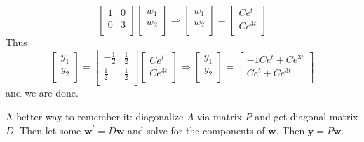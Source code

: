 \begin{solution}
\[\begin{bmatrix}
            1 &0   \\
             0&3   \\
        \end{bmatrix} \begin{bmatrix}
             w_1 \\
              w_2\\
        \end{bmatrix} \Longrightarrow \begin{bmatrix}
             w_1 \\
              w_2\\
        \end{bmatrix} = \begin{bmatrix}
             Ce^t \\
              Ce^{3t} \\
        \end{bmatrix}
    \]
    Thus
    \[
        \begin{bmatrix}
             y_1 \\
             y_2 \\
        \end{bmatrix} = \begin{bmatrix}
            -\frac{1}{2} &\frac{1}{2}   \\
             \frac{1}{2}&\frac{1}{2}   \\
        \end{bmatrix} \begin{bmatrix}
             Ce^t \\
              Ce^{3t} \\
        \end{bmatrix} \Longrightarrow \begin{bmatrix}
             y_1 \\
              y_2\\
        \end{bmatrix} = \begin{bmatrix}
             -1Ce^t + Ce^{3t}  \\
              Ce^t + Ce^{3t} \\
        \end{bmatrix}
    \]
    and we are done.
\end{solution}
\begin{remark}
    A better way to remember it: diagonalize \(A\) via matrix \(P\) and get diagonal matrix \(D\). Then let some \(\mathbf{w} ^{\prime} = D \mathbf{w} \) and solve for the components of \(\mathbf{w} \). Then \(\mathbf{y} = P \mathbf{w} \).
\end{remark}